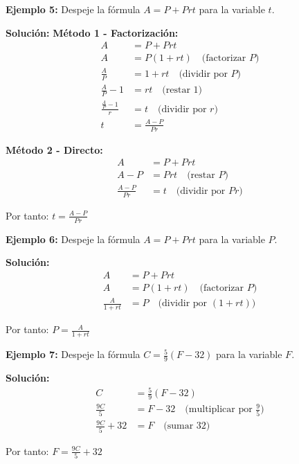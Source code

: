 
\begin{example}
\textbf{Ejemplo 5:} Despeje la fórmula $A = P + Prt$ para la variable $t$.

\textbf{Solución:}
\textbf{Método 1 - Factorización:}
\begin{align}
A &= P + Prt\\
A &= P(1 + rt) \quad \text{(factorizar $P$)}\\
\frac{A}{P} &= 1 + rt \quad \text{(dividir por $P$)}\\
\frac{A}{P} - 1 &= rt \quad \text{(restar 1)}\\
\frac{\frac{A}{P} - 1}{r} &= t \quad \text{(dividir por $r$)}\\
t &= \frac{A - P}{Pr}
\end{align}

\textbf{Método 2 - Directo:}
\begin{align}
A &= P + Prt\\
A - P &= Prt \quad \text{(restar $P$)}\\
\frac{A - P}{Pr} &= t \quad \text{(dividir por $Pr$)}
\end{align}

Por tanto: $t = \frac{A - P}{Pr}$
\end{example}

\begin{example}
\textbf{Ejemplo 6:} Despeje la fórmula $A = P + Prt$ para la variable $P$.

\textbf{Solución:}
\begin{align}
A &= P + Prt\\
A &= P(1 + rt) \quad \text{(factorizar $P$)}\\
\frac{A}{1 + rt} &= P \quad \text{(dividir por $(1 + rt)$)}
\end{align}

Por tanto: $P = \frac{A}{1 + rt}$
\end{example}

\begin{example}
\textbf{Ejemplo 7:} Despeje la fórmula $C = \frac{5}{9}(F-32)$ para la variable $F$.

\textbf{Solución:}
\begin{align}
C &= \frac{5}{9}(F-32)\\
\frac{9C}{5} &= F - 32 \quad \text{(multiplicar por $\frac{9}{5}$)}\\
\frac{9C}{5} + 32 &= F \quad \text{(sumar 32)}
\end{align}

Por tanto: $F = \frac{9C}{5} + 32$
\end{example}

